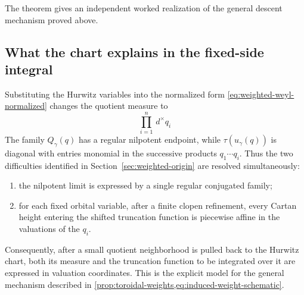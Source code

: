 \documentclass[11pt]{amsart}
\theoremstyle{definition}
\theoremstyle{remark}
\newcommand{\dmeas}{\,d^{\times}}
\begin{document}
The theorem gives an independent worked realization of the general descent
mechanism proved above.



\subsection{What the chart explains in the fixed-side integral}
Substituting the Hurwitz variables into the normalized form
\eqref{eq:weighted-weyl-normalized} changes the quotient measure to
\[
 \prod_{i=1}^n\dmeas q_i
\]
The family $Q_\gamma(q)$ has a regular nilpotent endpoint, while
$\tau(u_\gamma(q))$ is diagonal with entries monomial in the successive
products $q_1\cdots q_i$.  Thus the two difficulties identified in
Section~\ref{sec:weighted-origin} are resolved simultaneously:
\begin{enumerate}[label=\textup{(\roman*)},leftmargin=2.3em]
\item the nilpotent limit is expressed by a single regular conjugated family;
\item for each fixed orbital variable, after a finite clopen refinement, every
      Cartan height entering the shifted truncation function is piecewise
      affine in the valuations of the $q_i$.
\end{enumerate}
Consequently, after a small quotient neighborhood is pulled back to the
Hurwitz chart, both its measure and the truncation function to be integrated
over it are expressed in valuation coordinates.  This is the explicit model
for the general mechanism described in
\cref{prop:toroidal-weights,eq:induced-weight-schematic}.
\end{document}
